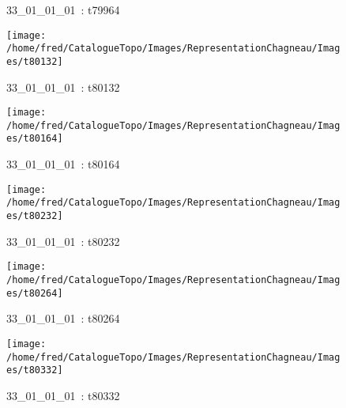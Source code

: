 \documentclass[12pt,titlepage]{book}
\begin{document}
\begin{figure}[h!]
\begin{minipage}[t]{3cm}
\begin{center}
      \caption[~33\_01\_01\_01]{\small{33\_01\_01\_01~:} \tiny{t79964}}\label{t79964}
    \end{center}
  \end{minipage}
  \begin{minipage}[t]{3cm}
    \begin{center}
      \texttt{[image: /home/fred/CatalogueTopo/Images/RepresentationChagneau/Images/t80132]}
      \caption[~33\_01\_01\_01]{\small{33\_01\_01\_01~:} \tiny{t80132}}\label{t80132}
    \end{center}
  \end{minipage}
  \begin{minipage}[t]{3cm}
    \begin{center}
      \texttt{[image: /home/fred/CatalogueTopo/Images/RepresentationChagneau/Images/t80164]}
      \caption[~33\_01\_01\_01]{\small{33\_01\_01\_01~:} \tiny{t80164}}\label{t80164}
    \end{center}
  \end{minipage}
  \begin{minipage}[t]{3cm}
    \begin{center}
      \texttt{[image: /home/fred/CatalogueTopo/Images/RepresentationChagneau/Images/t80232]}
      \caption[~33\_01\_01\_01]{\small{33\_01\_01\_01~:} \tiny{t80232}}\label{t80232}
    \end{center}
  \end{minipage}
  \begin{minipage}[t]{3cm}
    \begin{center}
      \texttt{[image: /home/fred/CatalogueTopo/Images/RepresentationChagneau/Images/t80264]}
      \caption[~33\_01\_01\_01]{\small{33\_01\_01\_01~:} \tiny{t80264}}\label{t80264}
    \end{center}
  \end{minipage}
  \begin{minipage}[t]{3cm}
    \begin{center}
      \texttt{[image: /home/fred/CatalogueTopo/Images/RepresentationChagneau/Images/t80332]}
      \caption[~33\_01\_01\_01]{\small{33\_01\_01\_01~:} \tiny{t80332}}\label{t80332}
    \end{center}
  \end{minipage}
  \begin{minipage}[t]{3cm}

\end{minipage}
\end{figure}
\end{document}
